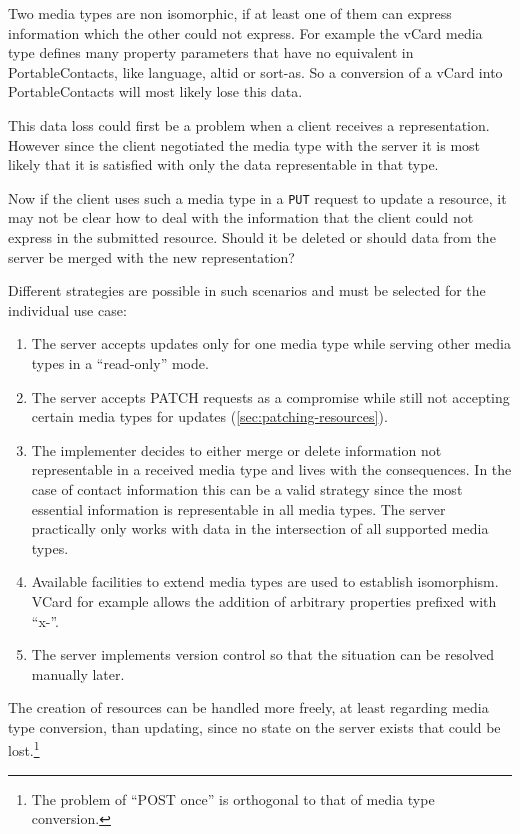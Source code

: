 \documentclass[11pt,a4paper,headsepline,twoside]{scrartcl}		%
\begin{document}
Two media types are non isomorphic, if at least one of them can express
information which the other could not express. For example the vCard media type
defines many property parameters that have no equivalent in PortableContacts,
like language, altid or sort-as. So a conversion of a vCard into
PortableContacts will most likely lose this data.

This data loss could first be a problem when a client receives a
representation. However since the client negotiated the media type with the
server it is most likely that it is satisfied with only the data representable
in that type.

Now if the client uses such a media type in a \lstinline:PUT: request to update
a resource, it may not be clear how to deal with the information that the client
could not express in the submitted resource. Should it be deleted or should data
from the server be merged with the new representation?

Different strategies are possible in such scenarios and must be selected for the
individual use case:

\begin{enumerate}
\item The server accepts updates only for one media type while serving other
  media types in a ``read-only'' mode.
\item The server accepts PATCH requests \cite{RFC5789} as a compromise while
  still not accepting certain media types for updates
  (\autoref{sec:patching-resources}).
\item The implementer decides to either merge or delete information not
  representable in a received media type and lives with the consequences. In the
  case of contact information this can be a valid strategy since the most
  essential information is representable in all media types. The server
  practically only works with data in the intersection of all supported
  media types.
\item Available facilities to extend media types are used to establish
  isomorphism. VCard for example allows the addition of arbitrary properties
  prefixed with ``x-''.
\item The server implements version control so that the situation can be
  resolved manually later.
\end{enumerate}

The creation of resources can be handled more freely, at least regarding media
type conversion, than updating, since no state on the server exists that could
be lost.\footnote{The problem of ``POST once'' is orthogonal to that of media
  type conversion.}
\end{document}
